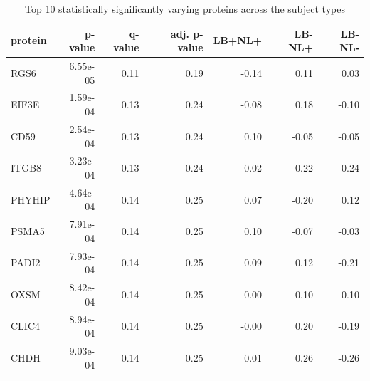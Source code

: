 \documentclass[11pt]{article}\usepackage[]{graphicx}\usepackage[usenames,dvipsnames]{color}
\begin{document}
\begin{table}[ht]
\centering
\begin{tabular}{lrrrrrr}
  \hline
{\bfseries  protein } & {\bfseries  p-value } & {\bfseries  q-value } & {\bfseries  adj. p-value } & {\bfseries  LB+NL+ } & {\bfseries  LB-NL+ } & {\bfseries  LB-NL- } \\ 
  \hline
RGS6 & 6.55e-05 & 0.11 & 0.19 & -0.14 & 0.11 & 0.03 \\ 
  EIF3E & 1.59e-04 & 0.13 & 0.24 & -0.08 & 0.18 & -0.10 \\ 
  CD59 & 2.54e-04 & 0.13 & 0.24 & 0.10 & -0.05 & -0.05 \\ 
  ITGB8 & 3.23e-04 & 0.13 & 0.24 & 0.02 & 0.22 & -0.24 \\ 
  PHYHIP & 4.64e-04 & 0.14 & 0.25 & 0.07 & -0.20 & 0.12 \\ 
  PSMA5 & 7.91e-04 & 0.14 & 0.25 & 0.10 & -0.07 & -0.03 \\ 
  PADI2 & 7.93e-04 & 0.14 & 0.25 & 0.09 & 0.12 & -0.21 \\ 
  OXSM & 8.42e-04 & 0.14 & 0.25 & -0.00 & -0.10 & 0.10 \\ 
  CLIC4 & 8.94e-04 & 0.14 & 0.25 & -0.00 & 0.20 & -0.19 \\ 
  CHDH & 9.03e-04 & 0.14 & 0.25 & 0.01 & 0.26 & -0.26 \\ 
   \hline
\end{tabular}
\caption{{\color{darkgray} Top 10 statistically significantly 
varying proteins across the subject types}} 
\end{table}
\end{document}
